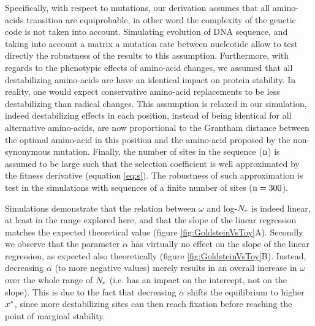 \documentclass{article}
\begin{document}
	Specifically, with respect to mutations, our derivation assumes that all amino-acids transition are equiprobable, in other word the complexity of the genetic code is not taken into account.
	Simulating evolution of DNA sequence, and taking into account a matrix a mutation rate between nucleotide allow to test directly the robustness of the results to this assumption.
	Furthermore, with regards to the phenotypic effects of amino-acid changes, we assumed that all destabilizing amino-acids are have an identical impact on protein stability.
	In reality, one would expect conservative amino-acid replacements to be less destabilizing than radical changes.
	This assumption is relaxed in our simulation, indeed destabilizing effects in each position, instead of being identical for all alternative amino-acids, are now proportional to the Grantham distance \cite{Grantham1974} between the optimal amino-acid in this position and the amino-acid proposed by the non-synonymous mutation.
	Finally, the number of sites in the sequence ($\text{n}$) is assumed to be large such that the selection coefficient is well approximated by the fitness derivative (equation \ref{eq:s}).
	The robustness of such approximation is test in the simulations with sequences of a finite number of sites ($\text{n}=300$).
	
	Simulations demonstrate that the relation between $\omega$ and log-$N_{\mathrm{e}}$ is indeed linear, at least in the range explored here, and that the slope of the linear regression matches the expected theoretical value (figure \ref{fig:GoldsteinVsToy}A).
	Secondly we observe that the parameter $\alpha$ has virtually no effect on the slope of the linear regression, as expected also theoretically (figure \ref{fig:GoldsteinVsToy}B). Instead, decreasing $\alpha$ (to more negative values) merely results in an overall increase in $\omega$ over the whole range of $N_{\mathrm{e}}$ (i.e. has an impact on the intercept, not on the slope). This is due to the fact that decreasing $\alpha$ shifts the equilibrium to higher $x^{*}$, since more destabilizing sites can then reach fixation before reaching the point of marginal stability.
	
\end{document}
